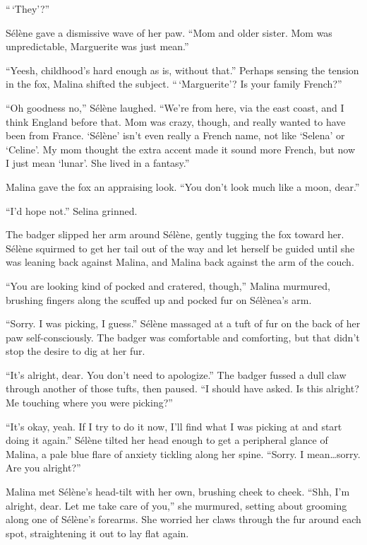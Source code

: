 ``\,`They'?''

Sélène gave a dismissive wave of her paw. ``Mom and older sister. Mom was unpredictable, Marguerite was just mean.''

``Yeesh, childhood's hard enough as is, without that.'' Perhaps sensing the tension in the fox, Malina shifted the subject. ``\,`Marguerite'? Is your family French?''

``Oh goodness no,'' Sélène laughed. ``We're from here, via the east coast, and I think England before that. Mom was crazy, though, and really wanted to have been from France. `Sélène' isn't even really a French name, not like `Selena' or `Celine'. My mom thought the extra accent made it sound more French, but now I just mean `lunar'. She lived in a fantasy.''

Malina gave the fox an appraising look. ``You don't look much like a moon, dear.''

``I'd hope not.'' Selina grinned.

The badger slipped her arm around Sélène, gently tugging the fox toward her. Sélène squirmed to get her tail out of the way and let herself be guided until she was leaning back against Malina, and Malina back against the arm of the couch.

``You are looking kind of pocked and cratered, though,'' Malina murmured, brushing fingers along the scuffed up and pocked fur on Sélènea's arm.

``Sorry. I was picking, I guess.'' Sélène massaged at a tuft of fur on the back of her paw self-consciously. The badger was comfortable and comforting, but that didn't stop the desire to dig at her fur.

``It's alright, dear. You don't need to apologize.'' The badger fussed a dull claw through another of those tufts, then paused. ``I should have asked. Is this alright? Me touching where you were picking?''

``It's okay, yeah. If I try to do it now, I'll find what I was picking at and start doing it again.'' Sélène tilted her head enough to get a peripheral glance of Malina, a pale blue flare of anxiety tickling along her spine. ``Sorry. I mean\ldots{}sorry. Are you alright?''

Malina met Sélène's head-tilt with her own, brushing cheek to cheek. ``Shh, I'm alright, dear. Let me take care of you,'' she murmured, setting about grooming along one of Sélène's forearms. She worried her claws through the fur around each spot, straightening it out to lay flat again.


